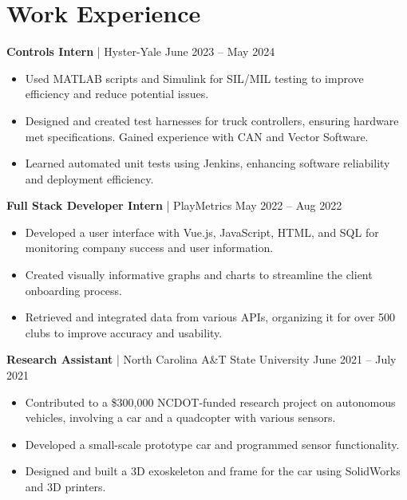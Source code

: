 \documentclass[letterpaper,9pt]{article}
\begin{document}
\section*{Work Experience}
\noindent \textbf{Controls Intern} | Hyster-Yale \hfill June 2023 – May 2024
\begin{itemize}[leftmargin=*,itemsep=0pt,topsep=0pt]
    \item Used MATLAB scripts and Simulink for SIL/MIL testing to improve efficiency and reduce potential issues.
    \item Designed and created test harnesses for truck controllers, ensuring hardware met specifications. Gained experience with CAN and Vector Software.
    \item Learned automated unit tests using Jenkins, enhancing software reliability and deployment efficiency.
\end{itemize}
\noindent \textbf{Full Stack Developer Intern} | PlayMetrics \hfill May 2022 – Aug 2022
\begin{itemize}[leftmargin=*,itemsep=0pt,topsep=0pt]
    \item Developed a user interface with Vue.js, JavaScript, HTML, and SQL for monitoring company success and user information.
    \item Created visually informative graphs and charts to streamline the client onboarding process.
    \item Retrieved and integrated data from various APIs, organizing it for over 500 clubs to improve accuracy and usability.
\end{itemize}

\noindent \textbf{Research Assistant} | North Carolina A\&T State University \hfill June 2021 – July 2021
\begin{itemize}[leftmargin=*,itemsep=0pt,topsep=0pt]
    \item Contributed to a \$300,000 NCDOT-funded research project on autonomous vehicles, involving a car and a quadcopter with various sensors.
    \item Developed a small-scale prototype car and programmed sensor functionality.
    \item Designed and built a 3D exoskeleton and frame for the car using SolidWorks and 3D printers.
\end{itemize}

\end{document}
